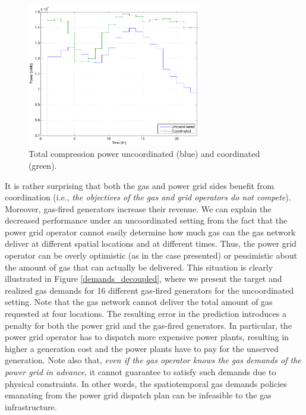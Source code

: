 \documentclass[11pt,twoside]{article}
\begin{document}
\begin{figure}[h!]
\begin{center}
\includegraphics[width=3in]{power_total.pdf}\caption{Total compression power uncoordinated (blue) and coordinated (green).}\label{powertotal}
\end{center}
\end{figure}

It is rather surprising that both the gas and power grid sides benefit from coordination (i.e., {\em the objectives of the gas and grid operators do not compete}). Moreover, gas-fired generators increase their revenue.  We can explain the decreased performance under an uncoordinated setting from the fact that the power grid operator cannot easily determine how much gas can the gas network deliver at different spatial locations and at different times. Thus, the power grid operator can be overly optimistic (as in the case presented) or pessimistic about the amount of gas that can actually be delivered. This situation is clearly illustrated in Figure \ref{demands_decoupled}, where we present the target and realized gas demands for 16 different gas-fired generators for the uncoordinated setting. Note that the gas network cannot deliver the total amount of gas requested at four locations. The resulting error in the prediction introduces a penalty for both the power grid and the gas-fired generators. In particular, the power grid operator has to dispatch more expensive power plants, resulting in higher a generation cost and the power plants have to pay for the unserved generation.  Note also that, {\em even if the gas operator knows the gas demands of the power grid in advance}, it cannot guarantee to satisfy such demands due to physical constraints.  In other words, the spatiotemporal gas demands policies emanating from the power grid dispatch plan can be infeasible to the gas infrastructure. 
\end{document}
